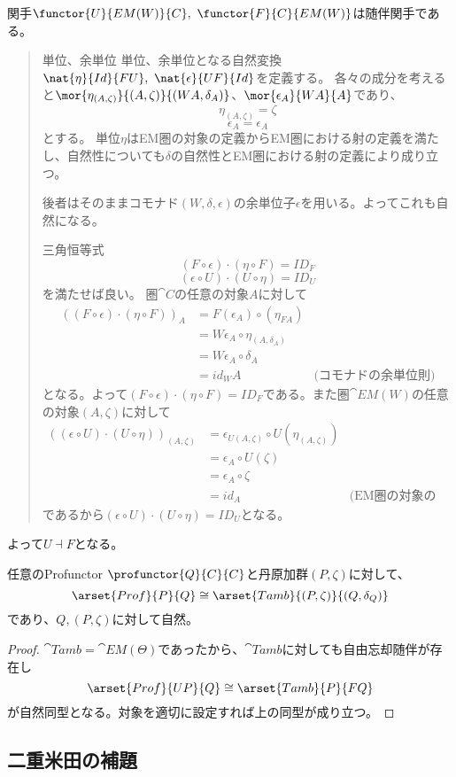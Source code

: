 \documentclass[uplatex,dvipdfmx]{jsarticle}
\begin{document}
  \begin{prop}[余自由忘却随伴]
    関手$\functor{U}{EM(W)}{C},\ \functor{F}{C}{EM(W)}$は随伴関手である。
    \begin{quote}
      \begin{mydescription}
        \item[単位、余単位]
        単位、余単位となる自然変換$\nat{\eta}{Id}{FU},\ \nat{\epsilon}{UF}{Id}$を定義する。
        各々の成分を考えると$\mor{\eta_{(A,\zeta)}}{(A,\zeta)}{(WA,\delta_A)}$、$\mor{\epsilon_A}{WA}{A}$であり、
        \[\eta_{(A,\zeta)} = \zeta\]
        \[\epsilon_A = \epsilon_A\]とする。
        単位$\eta$はEM圏の対象の定義からEM圏における射の定義を満たし、自然性についても$\delta$の自然性とEM圏における射の定義により成り立つ。

        後者はそのままコモナド$(W,\delta,\epsilon)$の余単位子$\epsilon$を用いる。よってこれも自然になる。
        \item[三角恒等式]
        \[(F\circ\epsilon)\cdot(\eta\circ F) = ID_F\]
        \[(\epsilon\circ U)\cdot(U\circ\eta) = ID_U\]を満たせば良い。
        圏$\cat{C}$の任意の対象$A$に対して
        \begin{align*}
          ((F\circ\epsilon)\cdot(\eta\circ F))_A&=F(\epsilon_A)\circ(\eta_{FA})\\
          &=W\epsilon_A\circ\eta_{(A,\delta_A)}\\
          &=W\epsilon_A\circ\delta_A\\
          &=id_WA&\text{(コモナドの余単位則)}
        \end{align*}
        となる。よって$(F\circ\epsilon)\cdot(\eta\circ F) = ID_F$である。また圏$\cat{EM}(W)$の任意の対象$(A,\zeta)$に対して
        \begin{align*}
          ((\epsilon\circ U)\cdot(U\circ\eta))_{(A,\zeta)}
          &=\epsilon_{U(A,\zeta)}\circ U(\eta_{(A,\zeta)})\\
          &=\epsilon_A\circ U(\zeta)\\
          &=\epsilon_A\circ \zeta\\
          &=id_A&\text{(EM圏の対象の定義)}
        \end{align*}
        であるから$(\epsilon\circ U)\cdot(U\circ\eta) = ID_U$となる。
      \end{mydescription}
    \end{quote}
    よって$U\dashv F$となる。
  \end{prop}
  \begin{prop}
    任意のProfunctor $\profunctor{Q}{C}{C}$と丹原加群$(P,\zeta)$に対して、\[\arset{Prof}{P}{Q}\cong\arset{Tamb}{(P,\zeta)}{(Q,\delta_Q)}\]であり、$Q,(P,\zeta)$に対して自然。
  \end{prop}
  \begin{proof}
    $\cat{Tamb} = \cat{EM}(\Theta)$であったから、$\cat{Tamb}$に対しても自由忘却随伴が存在し\[\arset{Prof}{UP}{Q}\cong\arset{Tamb}{P}{FQ}\]が自然同型となる。対象を適切に設定すれば上の同型が成り立つ。
  \end{proof}
  \subsection{二重米田の補題}
  
\end{document}
